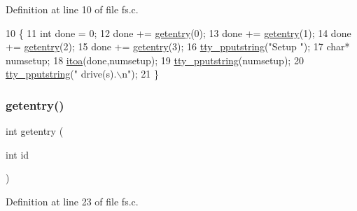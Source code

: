 Definition at line 10 of file fs.\+c.


\begin{DoxyCode}
10                   \{
11     \textcolor{keywordtype}{int} done = 0;
12     done += \hyperlink{a00125_a3fb32d07d3bd05144a196c94fc59c0d1_a3fb32d07d3bd05144a196c94fc59c0d1}{getentry}(0);
13     done += \hyperlink{a00125_a3fb32d07d3bd05144a196c94fc59c0d1_a3fb32d07d3bd05144a196c94fc59c0d1}{getentry}(1);
14     done += \hyperlink{a00125_a3fb32d07d3bd05144a196c94fc59c0d1_a3fb32d07d3bd05144a196c94fc59c0d1}{getentry}(2);
15     done += \hyperlink{a00125_a3fb32d07d3bd05144a196c94fc59c0d1_a3fb32d07d3bd05144a196c94fc59c0d1}{getentry}(3);
16     \hyperlink{a00140_ade960b1320324706aac6c00cc6b1b2fe_ade960b1320324706aac6c00cc6b1b2fe}{tty\_pputstring}(\textcolor{stringliteral}{"Setup "});
17     \textcolor{keywordtype}{char}* numsetup;
18     \hyperlink{a00104_af749add1ff19b6ff96a62f35ebb49b7e_af749add1ff19b6ff96a62f35ebb49b7e}{itoa}(done,numsetup);
19     \hyperlink{a00140_ade960b1320324706aac6c00cc6b1b2fe_ade960b1320324706aac6c00cc6b1b2fe}{tty\_pputstring}(numsetup);
20     \hyperlink{a00140_ade960b1320324706aac6c00cc6b1b2fe_ade960b1320324706aac6c00cc6b1b2fe}{tty\_pputstring}(\textcolor{stringliteral}{" drive(s).\(\backslash\)n"});
21 \}
\end{DoxyCode}
\mbox{\label{a00125_a3fb32d07d3bd05144a196c94fc59c0d1_a3fb32d07d3bd05144a196c94fc59c0d1}} 
\subsubsection{\texorpdfstring{getentry()}{getentry()}}
{\footnotesize\ttfamily int getentry (\begin{DoxyParamCaption}\item[{int}]{id }\end{DoxyParamCaption})}



Definition at line 23 of file fs.\+c.



